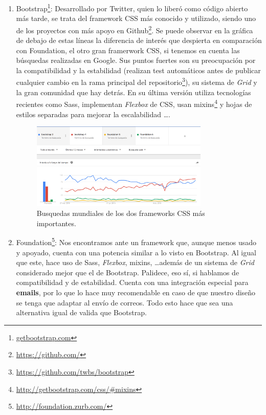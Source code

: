 \begin{enumerate}
  \item Bootstrap\footnote{\url{getbootstrap.com}}: Desarrollado por Twitter, quien lo liberó como código abierto más tarde, se trata del framework \gls{CSS} más conocido y utilizado, siendo uno de los proyectos con más apoyo en Github\footnote{\url{https://github.com/}}. Se puede observar en la gráfica de debajo de estas líneas la diferencia de interés que despierta en comparación con Foundation, el otro gran framerwork \gls{CSS}, si tenemos en cuenta las búsquedas realizadas en Google. Sus puntos fuertes son su preocupación por la compatibilidad y la estabilidad (realizan test automáticos antes de publicar cualquier cambio en la rama principal del repositorio\footnote{\url{https://github.com/twbs/bootstrap}}), su sistema de \emph{Grid} y la gran comunidad que hay detrás. En su última versión utiliza tecnologías recientes como \gls{Sass}, implementan \emph{Flexbox} de \gls{CSS}, usan \glspl{mixin}\footnote{\url{http://getbootstrap.com/css/#mixins}} y hojas de estilos separadas para mejorar la escalabilidad \ldots.

  \begin{figure}[H]
\centering
    \includegraphics[width=0.8\textwidth]{Figures/ch1/frameworks/graph_frameworks_css}
    \caption{Busquedas mundiales de los dos frameworks CSS más importantes.}
  \end{figure}

  \item Foundation\footnote{\url{http://foundation.zurb.com/}}: Nos encontramos ante un framework que, aunque menos usado y apoyado, cuenta con una potencia similar a lo visto en Bootstrap. Al igual que este, hace uso de \gls{Sass}, \emph{Flexbox}, \glspl{mixin}, \ldots además de un sistema de \emph{Grid} considerado mejor que el de Bootstrap. Palidece, eso sí, si hablamos de compatibilidad y de estabilidad. Cuenta con una integración especial para \textbf{emails}, por lo que lo hace muy recomendable en caso de que nuestro diseño se tenga que adaptar al envío de correos. Todo esto hace que sea una alternativa igual de valida que Bootstrap.
\end{enumerate}

